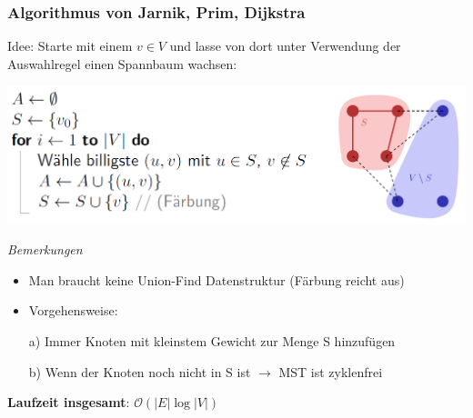 \vspace{-4pt}
\begin{sectionbox}
\subsubsection{Algorithmus von Jarnik, Prim, Dijkstra}\smallskip
Idee: Starte mit einem $v \in V$ und lasse von dort unter Verwendung der Auswahlregel einen Spannbaum wachsen:\par
\includegraphics[width = 0.9\columnwidth]{../img/MST_JPD.png}\par\smallskip
\textit{Bemerkungen}\par
\begin{itemize}
    \item Man braucht keine Union-Find Datenstruktur (Färbung reicht aus)
    \item Vorgehensweise:
    \par \tab a) Immer Knoten mit kleinstem Gewicht zur Menge S hinzufügen
    \par \tab b) Wenn der Knoten noch nicht in S ist $\to$ MST ist zyklenfrei
\end{itemize}\par\smallskip
\textbf{Laufzeit insgesamt}: $\mathcal{O}(|E| \log |V|)$
\end{sectionbox}